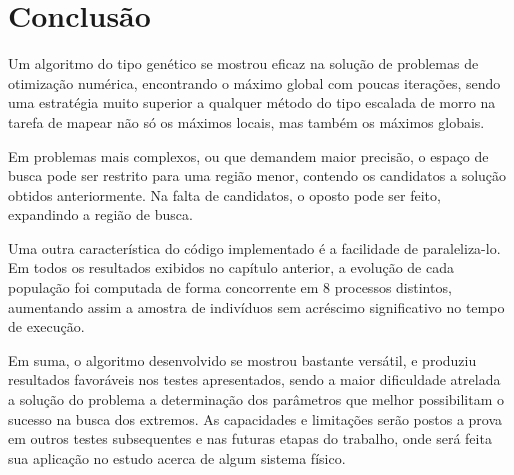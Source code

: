 \chapter{Conclusão}
\label{cap_conclusao}

Um algoritmo do tipo genético se mostrou eficaz na solução de problemas de otimização
numérica, encontrando o máximo global com poucas iterações, sendo uma
estratégia muito superior a qualquer método do tipo escalada de morro na
tarefa de mapear não só os máximos locais, mas também os máximos globais. 

Em problemas mais complexos, ou que demandem maior precisão, o espaço de busca pode ser restrito
para uma região menor, contendo os candidatos a solução obtidos anteriormente. Na falta de
candidatos, o oposto pode ser feito, expandindo a região de busca. 

Uma outra característica 
do código implementado é a facilidade de paraleliza-lo. Em todos os resultados exibidos no capítulo
anterior, a evolução de cada população foi computada de forma concorrente em 8 processos distintos,
aumentando assim a amostra de indivíduos sem acréscimo significativo no tempo de execução.

Em suma, o algoritmo desenvolvido se mostrou bastante versátil, e produziu resultados favoráveis nos 
testes apresentados, sendo a maior dificuldade atrelada a solução do problema a determinação dos
parâmetros que melhor possibilitam o sucesso na busca dos extremos. As capacidades e limitações serão postos
a prova em outros testes subsequentes e nas futuras etapas do trabalho, onde será feita sua aplicação 
no estudo acerca de algum sistema físico.

\nocite{ribeiro2013ga}